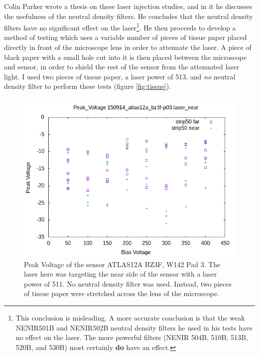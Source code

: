 \documentclass{report}
\begin{document}
            Colin Parker wrote a thesis on these laser injection studies, and in it he discusses the usefulness of the neutral density filters. He concludes that the neutral density filters have no significant effect on the laser\footnote{This conclusion is misleading. A more accurate conclusion is that the weak NENIR501B and NENIR502B neutral density filters he used in his tests have no effect on the laser. The more powerful filters (NENIR 504B, 510B, 513B, 520B, and 530B) most certainly \textbf{do} have an effect.}. He then proceeds to develop a method of testing which uses a variable number of pieces of tissue paper placed directly in front of the microscope lens in order to attenuate the laser. A piece of black paper with a small hole cut into it is then placed between the microscope and sensor, in order to shield the rest of the sensor from the attenuated laser light. I used two pieces of tissue paper, a laser power of 513, and \textit{no} neutral density filter to perform these tests (figure \ref{fig:tissue}).

            \begin{figure}[h] 
                \includegraphics[height=.4\textheight]{Peak_Voltage__150914_atlas12a_bz3f-p03__laser_near}
                \centering
                \caption{ Peak Voltage of the sensor ATLAS12A BZ3F, W142 Pad 3. The laser here was targeting the near side of the sensor with a laser power of 511. No neutral density filter was used. Instead, two pieces of tissue paper were stretched across the lens of the microscope. }
                \label{fig:Peak_Voltage__150914_atlas12a_bz3f-p03__laser_near}
            \end{figure}
\end{document}
